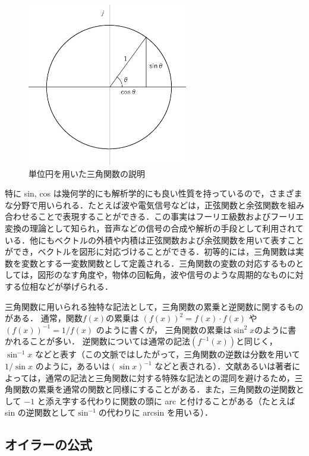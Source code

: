 \begin{figure}[H]
\begin{center}
\includegraphics[width=70mm]{fig/zu-0-2-2.eps}
\end{center}
\caption{単位円を用いた三角関数の説明}
\label{fig:sankakukansuu-tanien}
\end{figure}

特に sin, cos は幾何学的にも解析学的にも良い性質を持っているので，さまざまな分野で用いられる．たとえば波や電気信号などは，正弦関数と余弦関数を組み合わせることで表現することができる．この事実はフーリエ級数およびフーリエ変換の理論として知られ，音声などの信号の合成や解析の手段として利用されている．他にもベクトルの外積や内積は正弦関数および余弦関数を用いて表すことができ，ベクトルを図形に対応づけることができる．初等的には，三角関数は実数を変数とする一変数関数として定義される．三角関数の変数の対応するものとしては，図形のなす角度や，物体の回転角，波や信号のような周期的なものに対する位相などが挙げられる．

三角関数に用いられる独特な記法として，三角関数の累乗と逆関数に関するものがある．
通常，関数$f(x)$の累乗は
$(f(x))^2=f(x) \cdot f(x)$
や
$(f(x))^{-1}=1/f(x)$
のように書くが，
三角関数の累乗は$\sin^2 x$のように書かれることが多い．
逆関数については通常の記法$(f^{-1}(x))$と同じく，
$\sin^{-1}x$
などと表す（この文脈ではしたがって，三角関数の逆数は分数を用いて 
$1/\sin x$
 のように，あるいは$(\sin x)^{-1}$ などと表される）．文献あるいは著者によっては，通常の記法と三角関数に対する特殊な記法との混同を避けるため，三角関数の累乗を通常の関数と同様にすることがある．また，三角関数の逆関数として $-1$ と添え字する代わりに関数の頭に arc と付けることがある（たとえば sin の逆関数として$\sin^{-1}$の代わりに arcsin を用いる）．

\subsection{オイラーの公式}

